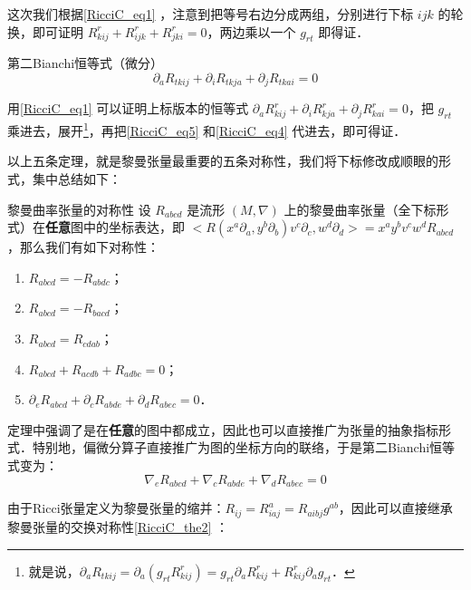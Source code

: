 这次我们根据\autoref{RicciC_eq1} ，注意到把等号右边分成两组，分别进行下标 $ijk$ 的轮换，即可证明 $R^r_{kij}+R^r_{ijk}+R^r_{jki}=0$，两边乘以一个 $g_{rt}$ 即得证．

\begin{theorem}{第二Bianchi恒等式（微分）}
\begin{equation}\label{RicciC_eq7}
\partial_aR_{tkij}+\partial_iR_{tkja}+\partial_jR_{tkai}=0
\end{equation}
\end{theorem}

用\autoref{RicciC_eq1} 可以证明上标版本的恒等式 $\partial_aR_{kij}^r+\partial_iR_{kja}^r+\partial_jR_{kai}^r=0$，把 $g_{rt}$ 乘进去，展开\footnote{就是说，$\partial_aR_{tkij}=\partial_a(g_{rt}R^{r}_{kij})=g_{rt}\partial_aR^r_{kij}+R^r_{kij}\partial_ag_{rt}$．}，再把\autoref{RicciC_eq5} 和\autoref{RicciC_eq4} 代进去，即可得证．


以上五条定理，就是黎曼张量最重要的五条对称性，我们将下标修改成顺眼的形式，集中总结如下：



\begin{corollary}{黎曼曲率张量的对称性}
设 $R_{abcd}$ 是流形 $(M, \nabla)$ 上的黎曼曲率张量（全下标形式）在\textbf{任意}图中的坐标表达，即 $<R(x^a\partial_a, y^b\partial_b)v^c\partial_c, w^d\partial_d>=x^ay^bv^cw^dR_{abcd}$，那么我们有如下对称性：
\begin{enumerate}
\item $R_{abcd}=-R_{abdc}$；
\item $R_{abcd}=-R_{bacd}$；
\item $R_{abcd}=R_{cdab}$；
\item $R_{abcd}+R_{acdb}+R_{adbc}=0$；
\item $\partial_eR_{abcd}+\partial_cR_{abde}+\partial_dR_{abec}=0$．
\end{enumerate}
\end{corollary}





定理中强调了是在\textbf{任意}的图中都成立，因此也可以直接推广为张量的抽象指标形式．特别地，偏微分算子直接推广为图的坐标方向的联络，于是第二Bianchi恒等式变为：
\begin{equation}\label{RicciC_eq8}
\nabla_eR_{abcd}+\nabla_cR_{abde}+\nabla_dR_{abec}=0
\end{equation}

由于Ricci张量定义为黎曼张量的缩并：$R_{ij}=R^a_{iaj}=R_{aibj}g^{ab}$，因此可以直接继承黎曼张量的交换对称性\autoref{RicciC_the2} ：

